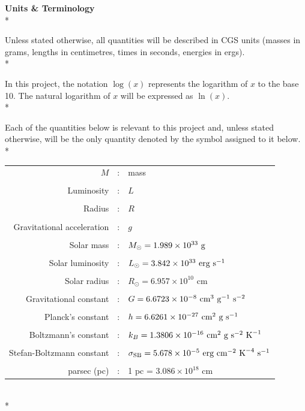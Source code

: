 \documentclass[12pt, a4paper]{report}
\begin{document}
\textbf{Units \& Terminology}\\*

Unless stated otherwise, all quantities will be described in CGS units (masses in grams, lengths in centimetres, times in seconds, energies in ergs). \\*

In this project, the notation $\log(x)$ represents the logarithm of $x$ to the base 10. The natural logarithm of $x$ will be expressed as $\ln(x)$. \\*

Each of the quantities below is relevant to this project and, unless stated otherwise, will be the only quantity denoted by the symbol assigned to it below.\\* 

\begin{tabular}{r@{ }c@{ }l}
$M$ &:& mass\\
\\
Luminosity &:& $L$ \\
\\
Radius &:& $R$ \\
\\
Gravitational acceleration &:& $g$ \\
\\
Solar mass &:& $M_{\odot} = 1.989 \times 10^{33} \textnormal{ g}$ \\
\\
Solar luminosity &:& $L_{\odot} = 3.842 \times 10^{33} \textnormal{ erg s}^{-1}$ \\
\\
Solar radius &:& $R_{\odot} = 6.957 \times 10^{10}$ cm \\
\\
Gravitational constant &:& $G = 6.6723 \times 10^{-8} \textnormal{ cm}^{3} \textnormal{ g}^{-1} \textnormal{ s}^{-2}$ \\
\\
Planck's constant &:& $h = 6.6261 \times 10^{-27} \textnormal{ cm}^{2} \textnormal{ g} \textnormal{ s}^{-1}$ \\
\\
Boltzmann's constant &:& $k_{B} = 1.3806 \times 10^{-16} \textnormal{ cm}^{2} \textnormal{ g} \textnormal{ s}^{-2}\textnormal{ K}^{-1}$ \\
\\
Stefan-Boltzmann constant &:& $\sigma_{\textnormal{SB}} = 5.678 \times 10^{-5} \textnormal{ erg cm}^{-2} \textnormal{ K}^{-4} \textnormal{ s}^{-1}$ \\
\\
parsec (pc) &:& 1 pc = $3.086 \times 10^{18}$ cm
\end{tabular}
\\*
\end{document}

